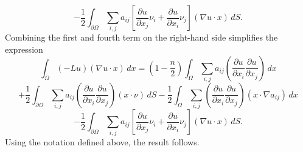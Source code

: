 $$- \frac{1}{2} \int_{\partial\Omega}
\sum_{i,j} a_{ij} \left[
\frac{\partial u}{\partial x_j} \nu_{i} +
\frac{\partial u}{\partial x_i} \nu_{j}
\right] (\nabla u\cdot x) \, dS.
$$
Combining the first and fourth term on the right-hand side
simplifies the expression
$$\int_{\Omega}(-Lu)(\nabla u\cdot x)\, dx
=
(1-\frac{n}{2}) \int_{\Omega}
\sum_{i,j} a_{ij} \left(
\frac{\partial u}{\partial x_i}
\frac{\partial u}{\partial x_j}
\right) \, dx
$$
$$
+
\frac{1}{2} \int_{\partial\Omega}
\sum_{i,j} a_{ij} \left(
\frac{\partial u}{\partial x_i}
\frac{\partial u}{\partial x_j}
\right) (x\cdot \nu ) \, dS
-
\frac{1}{2} \int_{\Omega}
\sum_{i,j} \left(
\frac{\partial u}{\partial x_i}
\frac{\partial u}{\partial x_j}
\right) (x\cdot  \nabla a_{ij}) \, dx
$$
$$
-
\frac{1}{2} \int_{\partial\Omega}
\sum_{i,j} a_{ij} \left[
\frac{\partial u}{\partial x_j} \nu_{i} +
\frac{\partial u}{\partial x_i} \nu_{j}
\right] (\nabla u\cdot x) \, dS.
$$
Using the notation defined above, the result follows.


%
